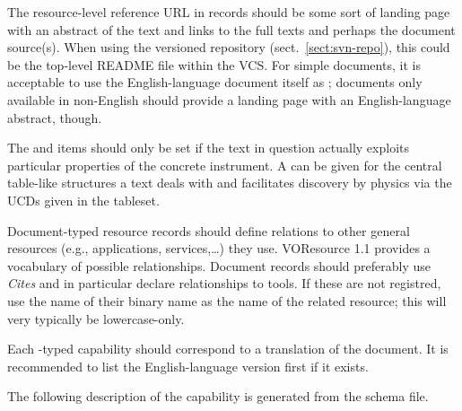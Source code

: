\documentclass{ivoa}
\begin{document}
The resource-level reference URL in  records should
be some sort of landing page with an abstract of the text and links to
the full texts and perhaps the document source(s).  When using the
versioned repository (sect.~\ref{sect:svn-repo}), this could be the
top-level README file within the VCS.  For simple documents, it is
acceptable to use the English-language document itself as
; documents only available in non-English should
provide a landing page with an English-language abstract, though.

The  and  items should only be set
if the text in question actually exploits particular properties of the
concrete instrument.  A  can be given for the central
table-like structures a text deals with and facilitates discovery by
physics via the UCDs given in the tableset.

Document-typed resource records should define relations to other
general resources (e.g., applications, services,\dots) 
they use.  VOResource 1.1 provides a vocabulary of possible
relationships. Document records should preferably use \emph{Cites} and
in particular declare relationships to tools.  If these are not
registred, use the name of their binary name as the name of the related
resource; this will very typically be lowercase-only.

Each -typed capability should 
correspond to a translation of the document.  It
is recommended to list the English-language version first if it exists.

The following description of the  capability
is generated from the schema file.
\end{document}
